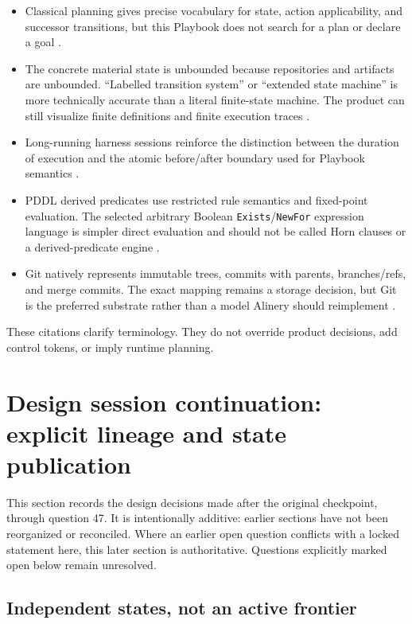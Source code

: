\documentclass[11pt]{article}
\newcommand{\artifact}[1]{\texttt{#1}}
\begin{document}
\begin{itemize}
  \item Classical planning gives precise vocabulary for state, action applicability, and successor transitions, but this Playbook does not search for a plan or declare a goal \cite{strips}.
  \item The concrete material state is unbounded because repositories and artifacts are unbounded. ``Labelled transition system'' or ``extended state machine'' is more technically accurate than a literal finite-state machine. The product can still visualize finite definitions and finite execution traces \cite{statecharts}.
  \item Long-running harness sessions reinforce the distinction between the duration of execution and the atomic before/after boundary used for Playbook semantics \cite{pddl21}.
  \item PDDL derived predicates use restricted rule semantics and fixed-point evaluation. The selected arbitrary Boolean \artifact{Exists}/\artifact{NewFor} expression language is simpler direct evaluation and should not be called Horn clauses or a derived-predicate engine \cite{pddl22,axioms}.
  \item Git natively represents immutable trees, commits with parents, branches/refs, and merge commits. The exact mapping remains a storage decision, but Git is the preferred substrate rather than a model Alinery should reimplement \cite{gitcommit,gitglossary}.
\end{itemize}

These citations clarify terminology. They do not override product decisions, add control tokens, or imply runtime planning.

\clearpage
\section{Design session continuation: explicit lineage and state publication}

\begin{summarybox}
This section records the design decisions made after the original checkpoint, through question 47. It is intentionally additive: earlier sections have not been reorganized or reconciled. Where an earlier open question conflicts with a locked statement here, this later section is authoritative. Questions explicitly marked open below remain unresolved.
\end{summarybox}

\subsection{Independent states, not an active frontier}
\end{document}
